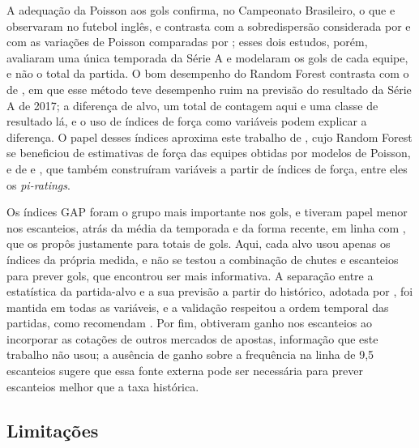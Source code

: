 A adequação da Poisson aos gols confirma, no Campeonato Brasileiro, o que  e  observaram no futebol inglês, e contrasta com a sobredispersão considerada por  e com as variações de Poisson comparadas por ; esses dois estudos, porém, avaliaram uma única temporada da Série A e modelaram os gols de cada equipe, e não o total da partida. O bom desempenho do Random Forest contrasta com o de , em que esse método teve desempenho ruim na previsão do resultado da Série A de 2017; a diferença de alvo, um total de contagem aqui e uma classe de resultado lá, e o uso de índices de força como variáveis podem explicar a diferença. O papel desses índices aproxima este trabalho de , cujo Random Forest se beneficiou de estimativas de força das equipes obtidas por modelos de Poisson, e de  e , que também construíram variáveis a partir de índices de força, entre eles os \textit{pi-ratings}.

Os índices GAP foram o grupo mais importante nos gols, e tiveram papel menor nos escanteios, atrás da média da temporada e da forma recente, em linha com , que os propôs justamente para totais de gols. Aqui, cada alvo usou apenas os índices da própria medida, e não se testou a combinação de chutes e escanteios para prever gols, que  encontrou ser mais informativa. A separação entre a estatística da partida-alvo e a sua previsão a partir do histórico, adotada por , foi mantida em todas as variáveis, e a validação respeitou a ordem temporal das partidas, como recomendam . Por fim,  obtiveram ganho nos escanteios ao incorporar as cotações de outros mercados de apostas, informação que este trabalho não usou; a ausência de ganho sobre a frequência na linha de 9,5 escanteios sugere que essa fonte externa pode ser necessária para prever escanteios melhor que a taxa histórica.

\subsection{Limitações}\label{subsec:DiscLimitacoes}

